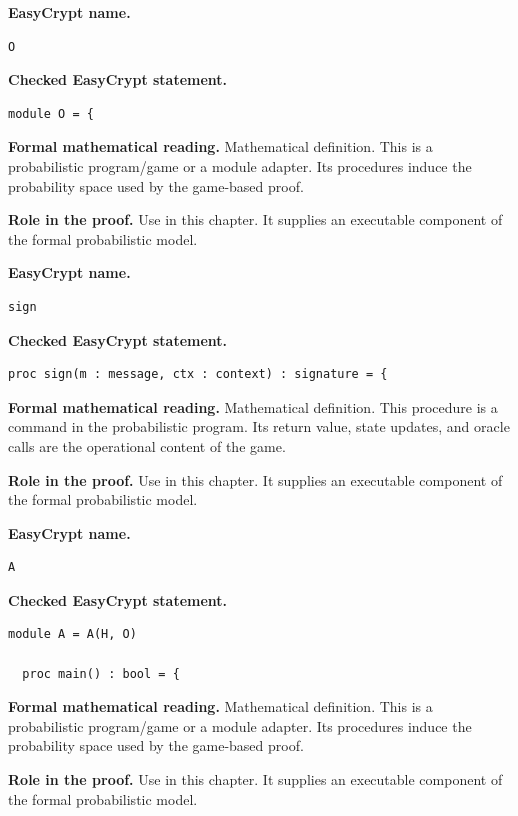 \begin{formaldefinition}
\noindent\textbf{EasyCrypt name.}
\begin{lstlisting}[language=EasyCrypt,basicstyle=\ttfamily\scriptsize]
O
\end{lstlisting}
\noindent\textbf{Checked EasyCrypt statement.}
\begin{lstlisting}[language=EasyCrypt,basicstyle=\ttfamily\scriptsize]
module O = {
\end{lstlisting}
\noindent\textbf{Formal mathematical reading.}
Mathematical definition. This is a probabilistic program/game or a module adapter.  Its procedures induce the probability space used by the game-based proof.

\noindent\textbf{Role in the proof.}
Use in this chapter. It supplies an executable component of the formal probabilistic model.

\end{formaldefinition}

\begin{formaldefinition}
\noindent\textbf{EasyCrypt name.}
\begin{lstlisting}[language=EasyCrypt,basicstyle=\ttfamily\scriptsize]
sign
\end{lstlisting}
\noindent\textbf{Checked EasyCrypt statement.}
\begin{lstlisting}[language=EasyCrypt,basicstyle=\ttfamily\scriptsize]
proc sign(m : message, ctx : context) : signature = {
\end{lstlisting}
\noindent\textbf{Formal mathematical reading.}
Mathematical definition. This procedure is a command in the probabilistic program.  Its return value, state updates, and oracle calls are the operational content of the game.

\noindent\textbf{Role in the proof.}
Use in this chapter. It supplies an executable component of the formal probabilistic model.

\end{formaldefinition}

\begin{formaldefinition}
\noindent\textbf{EasyCrypt name.}
\begin{lstlisting}[language=EasyCrypt,basicstyle=\ttfamily\scriptsize]
A
\end{lstlisting}
\noindent\textbf{Checked EasyCrypt statement.}
\begin{lstlisting}[language=EasyCrypt,basicstyle=\ttfamily\scriptsize]
module A = A(H, O)

  proc main() : bool = {
\end{lstlisting}
\noindent\textbf{Formal mathematical reading.}
Mathematical definition. This is a probabilistic program/game or a module adapter.  Its procedures induce the probability space used by the game-based proof.

\noindent\textbf{Role in the proof.}
Use in this chapter. It supplies an executable component of the formal probabilistic model.

\end{formaldefinition}

